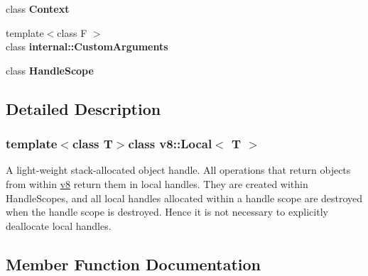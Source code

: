 \begin{DoxyCompactItemize}
\item 
\hypertarget{classv8_1_1_local_ac26c806e60ca4a0547680edb68f6e39b}{}class {\bfseries Context}\label{classv8_1_1_local_ac26c806e60ca4a0547680edb68f6e39b}

\item 
\hypertarget{classv8_1_1_local_a07108678a2af25caab612879ed7dca62}{}{\footnotesize template$<$class F $>$ }\\class {\bfseries internal\+::\+Custom\+Arguments}\label{classv8_1_1_local_a07108678a2af25caab612879ed7dca62}

\item 
\hypertarget{classv8_1_1_local_a5f127e488db492b05c8542cec0b880b7}{}class {\bfseries Handle\+Scope}\label{classv8_1_1_local_a5f127e488db492b05c8542cec0b880b7}

\end{DoxyCompactItemize}


\subsection{Detailed Description}
\subsubsection*{template$<$class T$>$class v8\+::\+Local$<$ T $>$}

A light-\/weight stack-\/allocated object handle. All operations that return objects from within \hyperlink{namespacev8}{v8} return them in local handles. They are created within Handle\+Scopes, and all local handles allocated within a handle scope are destroyed when the handle scope is destroyed. Hence it is not necessary to explicitly deallocate local handles. 

\subsection{Member Function Documentation}
\hypertarget{classv8_1_1_local_a5f4598866402a6a896e2bf5863a3ab4c}{}
